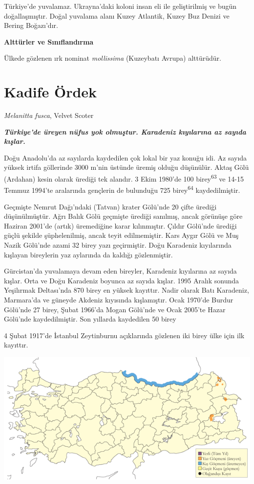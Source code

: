 \documentclass[
  letterpaper,
  DIV=11,
  numbers=noendperiod]{scrreprt}
\begin{document}
Türkiye'de yuvalamaz. Ukrayna'daki koloni insan eli ile geliştirilmiş ve
bugün doğallaşmıştır. Doğal yuvalama alanı Kuzey Atlantik, Kuzey Buz
Denizi ve Bering Boğazı'dır.

\textbf{Alttürler ve Sınıflandırma}

Ülkede gözlenen ırk nominat \emph{mollissima} (Kuzeybatı Avrupa)
alttürüdür.

\section{Kadife Ördek}\label{kadife-uxf6rdek}

\emph{Melanitta fusca}, Velvet Scoter

\textbf{\emph{Türkiye'de üreyen nüfus yok olmuştur. Karadeniz kıyılarına
az sayıda kışlar.}}

Doğu Anadolu'da az sayılarda kaydedilen çok lokal bir yaz konuğu idi. Az
sayıda yüksek irtifa göllerinde 3000 m'nin üstünde üremiş olduğu
düşünülür. Aktaş Gölü (Ardahan) kesin olarak ürediği tek alandır. 3 Ekim
1980'de 100 birey\textsuperscript{63} ve 14-15 Temmuz 1994'te aralarında
gençlerin de bulunduğu 725 birey\textsuperscript{64} kaydedilmiştir.

Geçmişte Nemrut Dağı'ndaki (Tatvan) krater Gölü'nde 20 çifte ürediği
düşünülmüştür. Ağrı Balık Gölü geçmişte ürediği sanılmış, ancak görünüşe
göre Haziran 2001'de (artık) üremediğine karar kılınmıştır. Çıldır
Gölü'nde ürediği güçlü şekilde şüphelenilmiş, ancak teyit edilmemiştir.
Kars Aygır Gölü ve Muş Nazik Gölü'nde azami 32 birey yazı geçirmiştir.
Doğu Karadeniz kıyılarında kışlayan bireylerin yaz aylarında da kaldığı
gözlenmiştir.

Gürcistan'da yuvalamaya devam eden bireyler, Karadeniz kıyılarına az
sayıda kışlar. Orta ve Doğu Karadeniz boyunca az sayıda kışlar. 1995
Aralık sonunda Yeşilırmak Deltası'nda 870 birey en yüksek kayıttır.
Nadir olarak Batı Karadeniz, Marmara'da ve güneyde Akdeniz kıyısında
kışlamıştır. Ocak 1970'de Burdur Gölü'nde 27 birey, Şubat 1966'da Mogan
Gölü'nde ve Ocak 2005'te Hazar Gölü'nde kaydedilmiştir. Son yıllarda
kaydedilen 50 birey

4 Şubat 1917'de İstanbul Zeytinburnu açıklarında gözlenen iki birey ülke
için ilk kayıttır.

\includegraphics{images/harita_Page_028.png}
\end{document}
